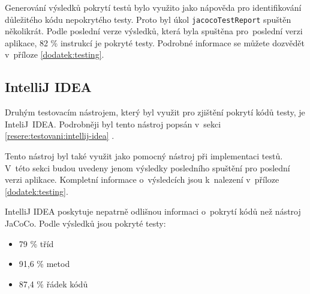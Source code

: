     Generování výsledků pokrytí testů bylo využito jako nápověda pro identifikování důležitého kódu nepokrytého testy. Proto byl úkol \verb|jacocoTestReport| spuštěn několikrát. Podle poslední verze výsledků, která byla spuštěna pro~poslední verzi aplikace, 82 \% instrukcí je pokryté testy. Podrobné informace se můžete dozvědět v~příloze \ref{dodatek:testing}.
    \subsection{IntelliJ IDEA}
    Druhým testovacím nástrojem, který byl využit pro zjištění pokrytí kódů testy, je InteliJ~IDEA. Podrobněji byl tento nástroj popsán v~sekci \ref{resere:testovani:intellij-idea} . 
    
    Tento nástroj byl také využit jako pomocný nástroj při implementaci testů. V~této sekci budou uvedeny jenom výsledky posledního spuštění pro poslední verzi aplikace. Kompletní informace o~výsledcích jsou k~nalezení v~příloze \ref{dodatek:testing}.
    
    IntelliJ IDEA poskytuje nepatrně odlišnou informaci o~pokrytí kódů než nástroj JaCoCo. Podle výsledků jsou pokryté testy:
    \begin{itemize}
            \setlength\itemsep{0.3em}
            \item 79 \% tříd
            \item 91,6 \% metod
            \item 87,4 \% řádek kódů
    \end{itemize}